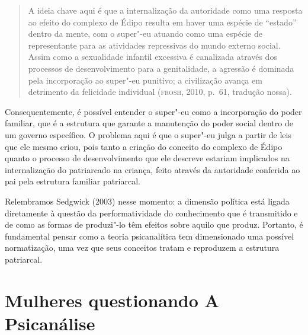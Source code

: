 \begin{quote}
A ideia chave aqui é que a internalização da autoridade como uma
resposta ao efeito do complexo de Édipo resulta em haver uma espécie de
``estado'' dentro da mente, com o super"-eu atuando como uma espécie de
representante para as atividades repressivas do mundo externo social.
Assim como a sexualidade infantil excessiva é canalizada através dos
processos de desenvolvimento para a genitalidade, a agressão é dominada
pela incorporação ao super"-eu punitivo; a civilização avança em
detrimento da felicidade individual (\textsc{frosh}, 2010, p.~61, tradução nossa).
\end{quote}

Consequentemente, é possível entender o super"-eu como a incorporação do
poder familiar, que é a estrutura que garante a manutenção do poder
social dentro de um governo específico. O problema aqui é que o super"-eu
julga a partir de leis que ele mesmo criou, pois tanto a criação do
conceito do complexo de Édipo quanto o processo de desenvolvimento que
ele descreve estariam implicados na internalização do patriarcado na
criança, feito através da autoridade conferida ao pai pela estrutura
familiar patriarcal.

Relembramos Sedgwick (2003) nesse momento: a dimensão política está
ligada diretamente à questão da performatividade do conhecimento que é
transmitido e de como as formas de produzi"-lo têm efeitos sobre aquilo
que produz. Portanto, é fundamental pensar como a teoria psicanalítica
tem dimensionado uma possível normatização, uma vez que seus conceitos
tratam e reproduzem a estrutura patriarcal.

\section{Mulheres questionando A Psicanálise}

